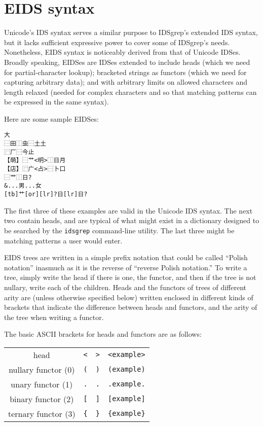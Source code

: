 \documentclass[twocolumn]{report}
\begin{document}

\section{EIDS syntax}

Unicode's IDS syntax serves a similar purpose to IDSgrep's extended IDS
syntax, but it lacks sufficient expressive power to cover some of IDSgrep's
needs.  Nonetheless, EIDS syntax is noticeably derived from that of Unicode
IDSes.  Broadly speaking, EIDSes are IDSes extended to include heads (which
we need for partial-character lookup); bracketed strings as functors (which
we need for capturing arbitrary data); and with arbitrary limits on allowed
characters and length relaxed (needed for complex characters and so that
matching patterns can be expressed in the same syntax).

Here are some sample EIDSes:
\begin{verbatim}
大
⿱田⿰虫⿱土土
⿸厂⿱今止
【萌】⿱艹<明>⿰日月
【店】⿸广<占>⿱卜口 
⿱艹⿰日?
&...男...女
[tb]艹[or][lr]?日[lr]日?
\end{verbatim}

The first three of these examples are valid in the Unicode IDS syntax.  The
next two contain heads, and are typical of what might exist in a dictionary
designed to be searched by the \texttt{idsgrep} command-line utility.  The
last three might be matching patterns a user would enter.

EIDS trees are written in a simple prefix notation that could be called
``Polish notation'' inasmuch as it is the reverse of ``reverse Polish
notation.'' To write a tree, simply write the head if there is one, the
functor, and then if the tree is not nullary, write each of the children. 
Heads and the functors of trees of different arity are (unless otherwise
specified below) written enclosed in different kinds of brackets that
indicate the difference between heads and functors, and the arity of the
tree when writing a functor.

The basic ASCII brackets for heads and functors are as follows:

\hspace*{\fill}
\begin{tabular}{cccc}
  head & \texttt{<} & \texttt{>} & \texttt{<example>} \\
  nullary functor (0) & \texttt{(} & \texttt{)} & \texttt{(example)} \\
  unary functor (1) & \texttt{.} & \texttt{.} & \texttt{.example.} \\
  binary functor (2) & \texttt{[} & \texttt{]} & \texttt{[example]} \\
  ternary functor (3) & \texttt{\{} & \texttt{\}} & \texttt{\{example\}}
\end{tabular}
\hspace*{\fill}\par
\end{document}
